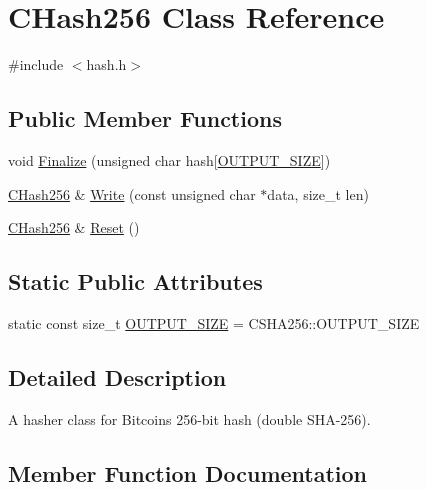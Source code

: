 \hypertarget{class_c_hash256}{}\section{C\+Hash256 Class Reference}
\label{class_c_hash256}


{\ttfamily \#include $<$hash.\+h$>$}

\subsection*{Public Member Functions}
\begin{DoxyCompactItemize}
\item 
void \hyperlink{class_c_hash256_aa8a70c1b7cf24ce7d00240a1131cf4e7}{Finalize} (unsigned char hash\mbox{[}\hyperlink{class_c_hash256_a6812a40441acb1c3b7f10c7e38c7d467}{O\+U\+T\+P\+U\+T\+\_\+\+S\+I\+Z\+E}\mbox{]})
\item 
\hyperlink{class_c_hash256}{C\+Hash256} \& \hyperlink{class_c_hash256_a9cc25033c6435cb28e2e8e377c949a7a}{Write} (const unsigned char $\ast$data, size\+\_\+t len)
\item 
\hyperlink{class_c_hash256}{C\+Hash256} \& \hyperlink{class_c_hash256_ab25b00e4cda7e209173f2ce90475953d}{Reset} ()
\end{DoxyCompactItemize}
\subsection*{Static Public Attributes}
\begin{DoxyCompactItemize}
\item 
static const size\+\_\+t \hyperlink{class_c_hash256_a6812a40441acb1c3b7f10c7e38c7d467}{O\+U\+T\+P\+U\+T\+\_\+\+S\+I\+Z\+E} = C\+S\+H\+A256\+::\+O\+U\+T\+P\+U\+T\+\_\+\+S\+I\+Z\+E
\end{DoxyCompactItemize}


\subsection{Detailed Description}
A hasher class for Bitcoin\textquotesingle{}s 256-\/bit hash (double S\+H\+A-\/256). 

\subsection{Member Function Documentation}
\hypertarget{class_c_hash256_aa8a70c1b7cf24ce7d00240a1131cf4e7}{}
